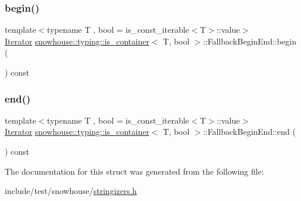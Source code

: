 \subsubsection{\texorpdfstring{begin()}{begin()}}
{\footnotesize\ttfamily template$<$typename T , bool  = is\+\_\+const\+\_\+iterable$<$\+T$>$\+::value$>$ \\
\mbox{\hyperlink{structsnowhouse_1_1typing_1_1is__container_ac43487bbcd55fc7a2e4a2be11d4ae94c}{Iterator}} \mbox{\hyperlink{structsnowhouse_1_1typing_1_1is__container}{snowhouse\+::typing\+::is\+\_\+container}}$<$ T, bool $>$\+::Fallback\+Begin\+End\+::begin (\begin{DoxyParamCaption}{ }\end{DoxyParamCaption}) const}

\mbox{\label{structsnowhouse_1_1typing_1_1is__container_1_1FallbackBeginEnd_a05d429bb082fa3996d2870d7149c4a39}} 
\subsubsection{\texorpdfstring{end()}{end()}}
{\footnotesize\ttfamily template$<$typename T , bool  = is\+\_\+const\+\_\+iterable$<$\+T$>$\+::value$>$ \\
\mbox{\hyperlink{structsnowhouse_1_1typing_1_1is__container_ac43487bbcd55fc7a2e4a2be11d4ae94c}{Iterator}} \mbox{\hyperlink{structsnowhouse_1_1typing_1_1is__container}{snowhouse\+::typing\+::is\+\_\+container}}$<$ T, bool $>$\+::Fallback\+Begin\+End\+::end (\begin{DoxyParamCaption}{ }\end{DoxyParamCaption}) const}



The documentation for this struct was generated from the following file\+:\begin{DoxyCompactItemize}
\item 
include/test/snowhouse/\mbox{\hyperlink{stringizers_8h}{stringizers.\+h}}\end{DoxyCompactItemize}
